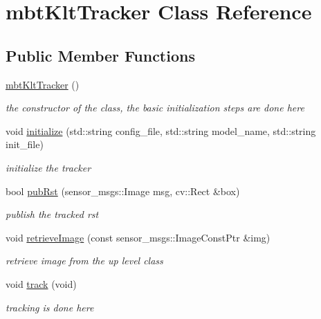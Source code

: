 \hypertarget{classmbtKltTracker}{\section{mbt\-Klt\-Tracker \-Class \-Reference}
\label{classmbtKltTracker}
}
\subsection*{\-Public \-Member \-Functions}
\begin{DoxyCompactItemize}
\item 
\hypertarget{classmbtKltTracker_ac7bd3fb4472175c6e950eb5c29148d0e}{\hyperlink{classmbtKltTracker_ac7bd3fb4472175c6e950eb5c29148d0e}{mbt\-Klt\-Tracker} ()}\label{classmbtKltTracker_ac7bd3fb4472175c6e950eb5c29148d0e}

\begin{DoxyCompactList}\small\item\em the constructor of the class, the basic initialization steps are done here \end{DoxyCompactList}\item 
\hypertarget{classmbtKltTracker_ae4746069ef2f9b24db30970ac353eae5}{void \hyperlink{classmbtKltTracker_ae4746069ef2f9b24db30970ac353eae5}{initialize} (std\-::string config\-\_\-file, std\-::string model\-\_\-name, std\-::string init\-\_\-file)}\label{classmbtKltTracker_ae4746069ef2f9b24db30970ac353eae5}

\begin{DoxyCompactList}\small\item\em initialize the tracker \end{DoxyCompactList}\item 
bool \hyperlink{classmbtKltTracker_a8e2db146326617d41012b83fe34e15af}{pub\-Rst} (sensor\-\_\-msgs\-::\-Image msg, cv\-::\-Rect \&box)
\begin{DoxyCompactList}\small\item\em publish the tracked rst \end{DoxyCompactList}\item 
void \hyperlink{classmbtKltTracker_a02142ff9f927f98478550cf1146156c9}{retrieve\-Image} (const sensor\-\_\-msgs\-::\-Image\-Const\-Ptr \&img)
\begin{DoxyCompactList}\small\item\em retrieve image from the up level class \end{DoxyCompactList}\item 
\hypertarget{classmbtKltTracker_ab4d84810ff270978235e0eb0cd92e7e6}{void \hyperlink{classmbtKltTracker_ab4d84810ff270978235e0eb0cd92e7e6}{track} (void)}\label{classmbtKltTracker_ab4d84810ff270978235e0eb0cd92e7e6}

\begin{DoxyCompactList}\small\item\em tracking is done here \end{DoxyCompactList}\end{DoxyCompactItemize}


